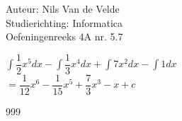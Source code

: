 \documentclass[a4paper]{article}
\begin{document}
  
\noindent \large Auteur: Nils Van de Velde \\
\noindent \large Studierichting: Informatica\\
\noindent \large Oefeningenreeks 4A nr. 5.7\\

\medskip

\normalsize

$\displaystyle\int\dfrac{1}{2}x^5dx-\displaystyle\int\dfrac{1}{3}x^4dx+\displaystyle\int7x^2dx-\displaystyle\int1dx$\\

$=\dfrac{1}{12}x^6-\dfrac{1}{15}x^5+\dfrac{7}{3}x^3-x+c$\\

\begin{thebibliography}{999}
\end{thebibliography}
\end{document}
